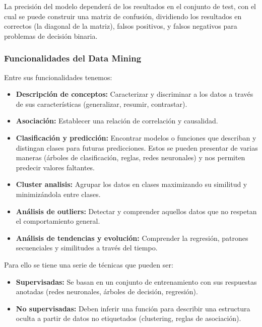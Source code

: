 La precisión del modelo dependerá de los resultados en el conjunto de test, con el  cual  se  puede construir una matriz de confusión, dividiendo los resultados en correctos (la diagonal de la matriz), falsos positivos, y falsos negativos para problemas de decisión binaria.

\subsubsection*{Funcionalidades del Data Mining}

Entre sus funcionalidades tenemos:
\begin{itemize}
    \item \textbf{Descripción de conceptos:} Caracterizar y discriminar a los datos a través de sus características (generalizar, resumir, contrastar).
    \item \textbf{Asociación:} Establecer una relación de correlación y causalidad.
    \item \textbf{Clasificación y predicción:} Encontrar modelos o funciones que describan y distingan clases para futuras predicciones. Estos se pueden presentar de varias maneras (árboles de clasificación, reglas, redes neuronales) y nos permiten predecir valores faltantes.
    \item \textbf{Cluster analisis:} Agrupar los datos en clases maximizando su similitud y minimizándola entre clases.
    \item \textbf{Análisis de outliers:} Detectar y comprender aquellos datos que no respetan el comportamiento general.
    \item \textbf{Análisis de tendencias y evolución:} Comprender la regresión, patrones secuenciales y similitudes a través del tiempo.
\end{itemize}
Para ello se tiene una serie de técnicas que pueden ser:
\begin{itemize}
    \item \textbf{Supervisadas:} Se basan en un conjunto de entrenamiento con sus respuestas anotadas (redes neuronales, árboles de decisión, regresión).
    \item \textbf{No supervisadas:} Deben inferir una función para describir una estructura oculta a partir de datos no etiquetados (clustering, reglas de asociación).
\end{itemize}


